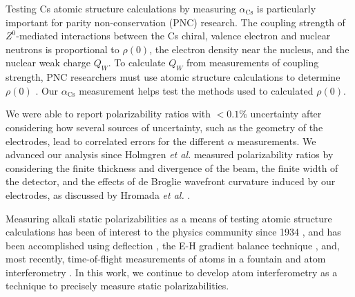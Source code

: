 \documentclass[twocolumn,prl,showpacs,superscriptaddress]{revtex4-1}   %
\newcommand{\acs}{\alpha_{\textrm{Cs}}}
\newcommand{\etal}{\textit{et al. }}
\begin{document}
Testing Cs atomic structure calculations by measuring $\acs$ is particularly important for parity non-conservation (PNC) research. The coupling strength of $Z^0$-mediated interactions between the Cs chiral, valence electron and nuclear neutrons is proportional to $\rho(0)$, the electron density near the nucleus, and the nuclear weak charge $Q_W$. To calculate $Q_W$ from measurements of coupling strength, PNC researchers must use atomic structure calculations to determine $\rho(0)$ \cite{Bouchiat1999,Dzuba2012}. Our $\acs$ measurement helps test the methods used to calculated $\rho(0)$.

We were able to report polarizability ratios with $< 0.1\%$ uncertainty after considering how several sources of uncertainty, such as the geometry of the electrodes, lead to correlated errors for the different $\alpha$ measurements. We advanced our analysis since Holmgren \etal measured polarizability ratios by considering the finite thickness and divergence of the beam, the finite width of the detector, and the effects of de Broglie wavefront curvature induced by our electrodes, as discussed by Hromada \etal \cite{Hromada2014}.


Measuring alkali static polarizabilities as a means of testing atomic 
structure calculations has been of interest to the physics community since
1934 \cite{Scheffers1934}, and has been
accomplished using deflection \cite{Scheffers1934,Chamberlain1963,Hall1974}, the E-H gradient
balance technique \cite{Salop1961,Molof1974}, and, most recently, time-of-flight measurements of atoms in a fountain \cite{Amini2003} and atom interferometry 
\cite{Ekstrom1995,Miffre2006,Holmgren2010}. In this work, we continue to develop atom interferometry as a technique to precisely measure static polarizabilities.
\end{document}
